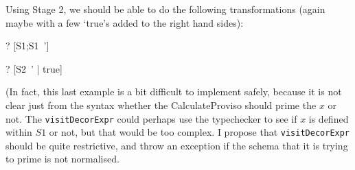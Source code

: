 \documentclass{article}
\begin{document}
Using Stage 2, we should be able to
do the following transformations (again maybe with a few
`true's added to the right hand sides):

\begin{zed}
\vdash? [S1;S1~'] 
\end{zed}
\begin{zed}
\vdash? [S2~' | true] \unfoldsTo [S1~'; y':\nat | y'<x']
\end{zed}

(In fact, this last example is a bit difficult to implement safely,
because it is not clear just from the syntax whether the CalculateProviso
should prime the $x$ or not.  The \verb!visitDecorExpr! could perhaps
use the typechecker to see if $x$ is defined within $S1$ or not, but
that would be too complex.  I propose that \verb!visitDecorExpr! should
be quite restrictive, and throw an exception if the schema that it
is trying to prime is not normalised.
\end{document}
